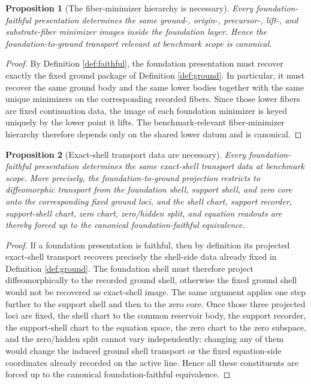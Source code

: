 \documentclass[11pt]{article}
\newtheorem{proposition}{Proposition}
\begin{document}
\begin{proposition}[The fiber-minimizer hierarchy is necessary]
\label{prop:minimizers}
Every foundation-faithful presentation determines the same ground-, origin-, precursor-, lift-, and substrate-fiber minimizer images inside the foundation layer. Hence the foundation-to-ground transport relevant at benchmark scope is canonical.
\end{proposition}

\begin{proof}
By Definition \ref{def:faithful}, the foundation presentation must recover exactly the fixed ground package of Definition \ref{def:ground}. In particular, it must recover the same ground body and the same lower bodies together with the same unique minimizers on the corresponding recorded fibers. Since those lower fibers are fixed continuation data, the image of each foundation minimizer is keyed uniquely by the lower point it lifts. The benchmark-relevant fiber-minimizer hierarchy therefore depends only on the shared lower datum and is canonical.
\end{proof}

\begin{proposition}[Exact-shell transport data are necessary]
\label{prop:shell}
Every foundation-faithful presentation determines the same exact-shell transport data at benchmark scope. More precisely, the foundation-to-ground projection restricts to diffeomorphic transport from the foundation shell, support shell, and zero core onto the corresponding fixed ground loci, and the shell chart, support recorder, support-shell chart, zero chart, zero/hidden split, and equation readouts are thereby forced up to the canonical foundation-faithful equivalence.
\end{proposition}

\begin{proof}
If a foundation presentation is faithful, then by definition its projected exact-shell transport recovers precisely the shell-side data already fixed in Definition \ref{def:ground}. The foundation shell must therefore project diffeomorphically to the recorded ground shell, otherwise the fixed ground shell would not be recovered as exact-shell image. The same argument applies one step further to the support shell and then to the zero core. Once those three projected loci are fixed, the shell chart to the common reservoir body, the support recorder, the support-shell chart to the equation space, the zero chart to the zero subspace, and the zero/hidden split cannot vary independently: changing any of them would change the induced ground shell transport or the fixed equation-side coordinates already recorded on the active line. Hence all these constituents are forced up to the canonical foundation-faithful equivalence.
\end{proof}
\end{document}
